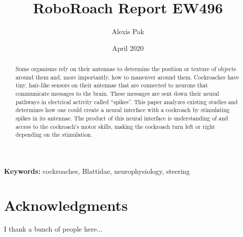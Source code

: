 \documentclass{article}
\title{RoboRoach Report EW496}
\author{Alexis Pak}
\date{April 2020}
\begin{document}
\maketitle
\begin{abstract}
Some organisms rely on their antennae to determine the position or texture of objects around them and, more importantly, how to maneuver around them. Cockroaches have tiny, hair-like sensors on their antennae that are connected to neurons that communicate messages to the brain. These messages are sent down their neural pathways in electrical activity called ``spikes''. This paper analyzes existing studies and determines how one could create a neural interface with a cockroach by stimulating spikes in its antennae. The product of this neural interface is understanding of and access to the cockroach's motor skills, making the cockroach turn left or right depending on the stimulation. 
\end{abstract}

{\scriptsize\textbf{Keywords:} cockroaches, Blattidae, neurophysiology, steering}




\section{Acknowledgments}
I thank a bunch of people here... 


\end{document}
